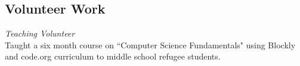 \documentclass[margin,line]{resume}
\begin{document}
\begin{resume}
\section{Volunteer Work}
{\small
  {\sl Teaching Volunteer} \\
  Taught a six month course on ``Computer Science Fundamentals" using Blockly and code.org curriculum
  to middle school refugee students.
}
\end{resume}
\end{document}
